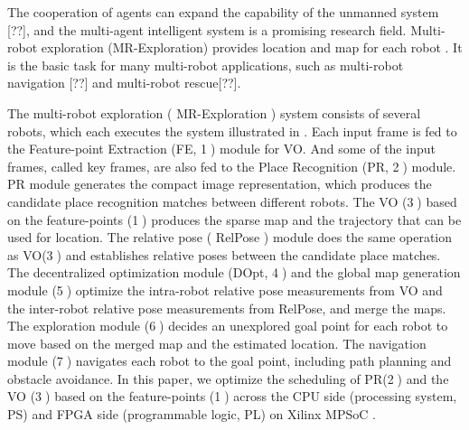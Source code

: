 \label{sec:intro}

The cooperation of agents can expand the capability of the unmanned system [??], and the multi-agent intelligent system is a promising research field.
Multi-robot exploration (MR-Exploration) \cite{corah2019communication} provides location and map for each robot . It is the basic task for many multi-robot applications, such as multi-robot navigation [??] and multi-robot rescue[??].

The multi-robot exploration ( MR-Exploration ) system \cite{corah2019communication, cieslewski2018data} consists of several robots, which each executes the system illustrated in . Each input frame is fed to the Feature-point Extraction (FE, \textcircled{1}) module for VO. 
And some of the input frames, called key frames, are also fed to the Place Recognition (PR, \textcircled{2}) module.
PR module generates the compact image representation, which produces the candidate place recognition matches between different robots. The VO (\textcircled{3}) based on the feature-points (\textcircled{1}) produces the sparse map and the trajectory that can be used for location. The relative pose ( RelPose ) module does the same operation as VO(\textcircled{3}) and establishes relative poses between the candidate place matches. The decentralized optimization module (DOpt, \textcircled{4}) and the global map generation module (\textcircled{5}) optimize the intra-robot relative pose measurements from VO and the inter-robot relative pose measurements from RelPose, and merge the maps. The exploration module (\textcircled{6}) decides an unexplored goal point for each robot to move based on the merged map and the estimated location. The navigation module (\textcircled{7}) navigates each robot to the goal point, including path planning and obstacle avoidance.
In this paper, we optimize the scheduling of PR(\textcircled{2}) and the VO (\textcircled{3}) based on the feature-points (\textcircled{1}) across the CPU side (processing system, PS) and FPGA side (programmable logic, PL) on Xilinx MPSoC \cite{MPSoC}.


